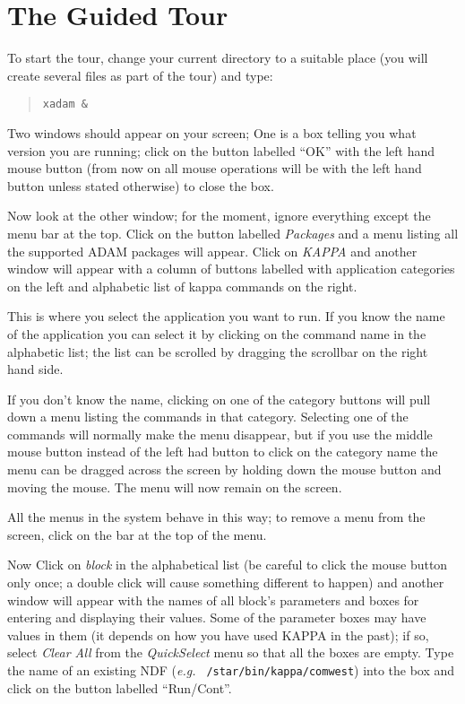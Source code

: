 \section{The Guided Tour}
\begin{list}{
}{\setlength{\rightmargin}{\leftmargin}}
\item To start the tour, change your current directory to a suitable
place (you will create several files as
part of the tour) and type:

\begin{quote}
\tt xadam \&
\end{quote}

Two windows should appear on your screen; One is a box telling you what
version you are running; click on the button labelled ``OK'' with the
left hand mouse button (from now on all mouse operations will be with
the left hand button unless stated otherwise) to close the box.

\item Now look at the other window; for the moment, ignore everything
except the menu bar at the top.  Click on the button labelled {\em
Packages} and a menu listing all the supported ADAM packages will
appear.  Click on {\em KAPPA} and another window will appear with a
column of buttons labelled with application categories on the left and
alphabetic list of kappa commands on the right.

This is where you select the application you want to run. If you know
the name of the application you can select it by clicking on the
command name in the alphabetic list; the list can be scrolled by
dragging the scrollbar on the right hand side.

If you don't know the name, clicking on one of the category buttons
will pull down a menu listing the commands in that category. Selecting
one of the commands will normally make the menu disappear, but if you
use the middle mouse button instead of the left had button to click on
the category name the menu can be dragged across the screen by holding
down the mouse button and moving the mouse. The menu will now remain on
the screen.

All the menus in the system behave in this way; to remove a menu from the
screen, click on the bar at the top of the menu.

\item Now Click on {\em block} in the alphabetical list (be careful to
click the mouse button only once; a double click will cause something
different to happen) and another window will appear with the names of
all block's parameters and boxes for entering and displaying their
values.  Some of the parameter boxes may have values in them (it
depends on how you have used KAPPA in the past); if so, select {\em
Clear All} from the {\em QuickSelect} menu so that all the boxes are
empty.  Type the name of an existing NDF ({\em e.g.}\/ {\tt
/star/bin/kappa/comwest}) into the box and click on the button labelled
``Run/Cont''.


\end{list}

